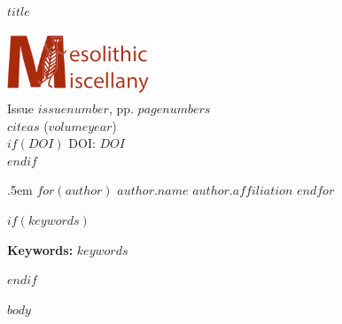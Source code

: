 \documentclass[hidelinks,12pt,a4paper]{article}
\newcommand{\titlesize}{\fontsize{22.0}{20pt}\selectfont}
\begin{document}
\begin{sf}
{\raggedright %
\begin{minipage}[t]{120mm}
  \vskip 2.5pt%
{\raggedright\titlesize\textbf{$title$} \par}
    \end{minipage}\hspace{7mm}\begin{minipage}[t]{40.0mm}
\hbox{}\includegraphics[height=19mm]{MM_Logo}\\
\scriptsize{Issue $issuenumber$, pp. $pagenumbers$}\\ 
\scriptsize{$citeas$ ($volumeyear$)}\\
$if(DOI)$
\scriptsize{DOI: $DOI$}\\
$endif$
\end{minipage}

{\par\large%
      \vspace*{5mm}
      \lineskip .5em%
$for(author)$
                               \textbf{$author.name$} \hskip 15pt \emph{\small $author.affiliation$}      \vskip 5pt 
 $endfor$
     \vskip 20pt%
         {\noindent\usebox\absbox\par}
         
 $if(keywords)$
    {\vspace{15pt}%
      {\noindent\normalsize \textbf{Keywords:} $keywords$ }\par}
      \vspace{6mm}
      \par%
$endif$    
 
 
 
  }}
\end{sf}



 \setlength{\parindent}{0em}

 $body$
\end{document}
